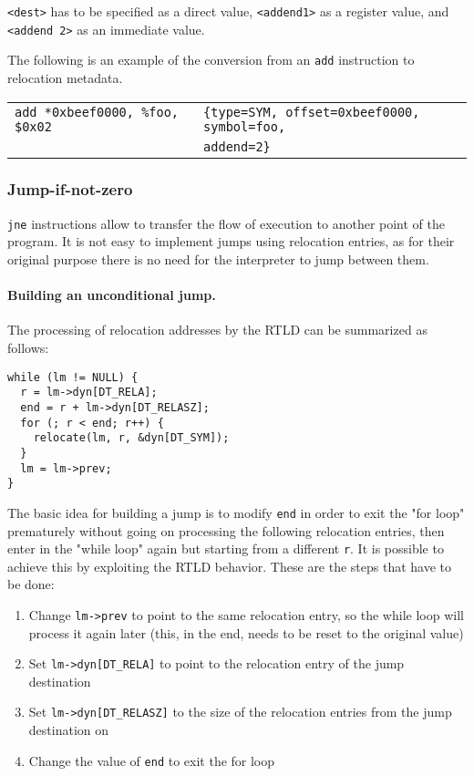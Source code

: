 \documentclass[11pt,twoside,a4paper]{article}
\begin{document}
\texttt{<dest>} has to be specified as a direct value, \texttt{<addend1>} as a register value, and \texttt{<addend 2>} as an immediate value.

The following is an example of the conversion from an \texttt{add} instruction to relocation metadata.

\begin{tabular}{ l | l }
  \hline
  \texttt{add *0xbeef0000, \%foo, \$0x02} & \texttt{\{type=SYM, offset=0xbeef0000, symbol=foo,} \\ 
& \texttt{addend=2\}} \\
  \hline
\end{tabular}


\subsubsection{Jump-if-not-zero}
\texttt{jne} instructions allow to transfer the flow of execution to another point of the program. It is not easy to implement jumps using relocation entries, as for their original purpose there is no need for the interpreter to jump between them.

\paragraph{Building an unconditional jump.}
The processing of relocation addresses by the RTLD can be summarized as follows:
\begin{lstlisting}
while (lm != NULL) {
  r = lm->dyn[DT_RELA];
  end = r + lm->dyn[DT_RELASZ];
  for (; r < end; r++) {
    relocate(lm, r, &dyn[DT_SYM]);
  }
  lm = lm->prev;
}
\end{lstlisting}

The basic idea for building a jump is to modify \texttt{end} in order to exit the "for loop" prematurely without going on processing the following relocation entries, then enter in the "while loop" again but starting from a different \texttt{r}.
It is possible to achieve this by exploiting the RTLD behavior. These are the steps that have to be done:

\begin{enumerate}
\item Change \texttt{lm->prev} to point to the same relocation entry, so the while loop will process it again later (this, in the end, needs to be reset to the original value)
\item Set \texttt{lm->dyn[DT\_RELA]} to point to the relocation entry of the jump destination
\item Set \texttt{lm->dyn[DT\_RELASZ]} to the size of the relocation entries from the jump destination on
\item Change the value of \texttt{end} to exit the for loop
\end{enumerate}
\end{document}

